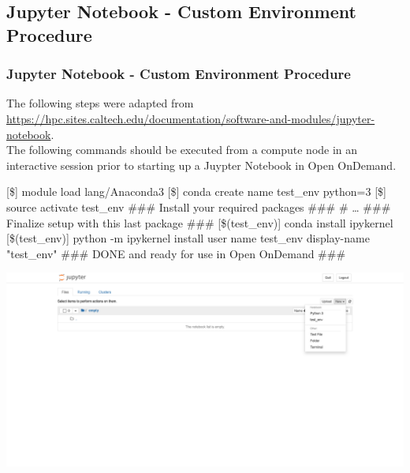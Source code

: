 \subsection[jupenv]{Jupyter Notebook - Custom Environment Procedure}
\begin{frame}[fragile]
	\frametitle{Jupyter Notebook - Custom Environment Procedure}
	\begin{block}{}
	The following steps were adapted from \url{https://hpc.sites.caltech.edu/documentation/software-and-modules/jupyter-notebook}.~\\The following commands should be executed from a compute node in an interactive session prior to starting up a Juypter Notebook in Open OnDemand.
	\end{block}
	\begin{semiverbatim}\footnotesize
	[\$] module load lang/Anaconda3
	[\$] conda create \ddash{}name test\_env python=3
	[\$] source activate test\_env
	\#\#\# Install your required packages \#\#\#
	\# \ldots 
	\#\#\# Finalize setup with this last package \#\#\#
	[\$(test\_env)] conda install ipykernel
	[\$(test\_env)] python -m ipykernel install \ddash{}user \ddash{}name test\_env \ddash{}display-name "test\_env"
	\#\#\# DONE and ready for use in Open OnDemand \#\#\#
 	\end{semiverbatim}
	\vspace{-1.5em}
	\begin{center}
  \includegraphics[scale=0.08]{juypter.png}
	\end{center}
	
\end{frame}

